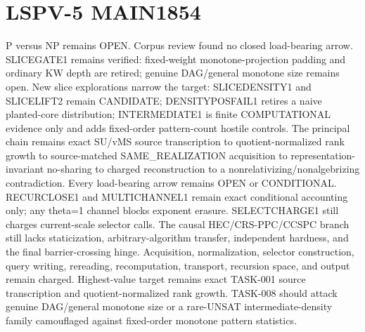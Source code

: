 \documentclass{article}
\begin{document}
\section*{LSPV-5 MAIN1854}
P versus NP remains OPEN. Corpus review found no closed load-bearing arrow. SLICEGATE1 remains verified: fixed-weight monotone-projection padding and ordinary KW depth are retired; genuine DAG/general monotone size remains open. New slice explorations narrow the target: SLICEDENSITY1 and SLICELIFT2 remain CANDIDATE; DENSITYPOSFAIL1 retires a naive planted-core distribution; INTERMEDIATE1 is finite COMPUTATIONAL evidence only and adds fixed-order pattern-count hostile controls. The principal chain remains exact SU/vMS source transcription to quotient-normalized rank growth to source-matched SAME_REALIZATION acquisition to representation-invariant no-sharing to charged reconstruction to a nonrelativizing/nonalgebrizing contradiction. Every load-bearing arrow remains OPEN or CONDITIONAL. RECURCLOSE1 and MULTICHANNEL1 remain exact conditional accounting only; any theta=1 channel blocks exponent erasure. SELECTCHARGE1 still charges current-scale selector calls. The causal HEC/CRS-PPC/CCSPC branch still lacks staticization, arbitrary-algorithm transfer, independent hardness, and the final barrier-crossing hinge. Acquisition, normalization, selector construction, query writing, rereading, recomputation, transport, recursion space, and output remain charged. Highest-value target remains exact TASK-001 source transcription and quotient-normalized rank growth. TASK-008 should attack genuine DAG/general monotone size or a rare-UNSAT intermediate-density family camouflaged against fixed-order monotone pattern statistics.
\end{document}
